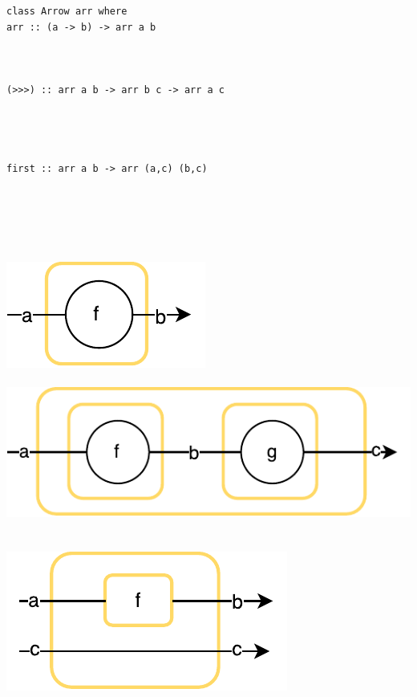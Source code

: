 \begin{minipage}{\textwidth}
\begin{minipage}{0.5\textwidth}
\begin{lstlisting}[frame=htrbl]
class Arrow arr where
arr :: (a -> b) -> arr a b



(>>>) :: arr a b -> arr b c -> arr a c




first :: arr a b -> arr (a,c) (b,c)
\end{lstlisting}
\end{minipage}
~~~~
\begin{minipage}{0.25\textwidth}
	~\\~\\~\\
	\includegraphics[scale=0.6]{images/arr}~\\~\\
	\includegraphics[scale=0.6]{images/compose}~\\~\\
	\includegraphics[scale=0.6]{images/first}~\\~\\
\end{minipage}
\end{minipage}

